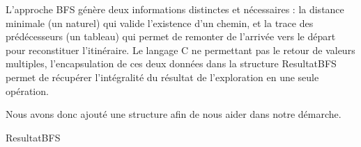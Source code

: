 
L'approche BFS génère deux informations distinctes et nécessaires : la distance minimale (un naturel) qui valide l'existence d'un chemin, et la trace des prédécesseurs (un tableau) qui permet de remonter de l'arrivée vers le départ pour reconstituer l'itinéraire. Le langage C ne permettant pas le retour de valeurs multiples, l'encapsulation de ces deux données dans la structure ResultatBFS permet de récupérer l'intégralité du résultat de l'exploration en une seule opération.

Nous avons donc ajouté une structure afin de nous aider dans notre démarche.

\item[$\bullet$] 
        \begin{enregistrement}{ResultatBFS}
        \end{enregistrement}
        
\vspace{1cm}

